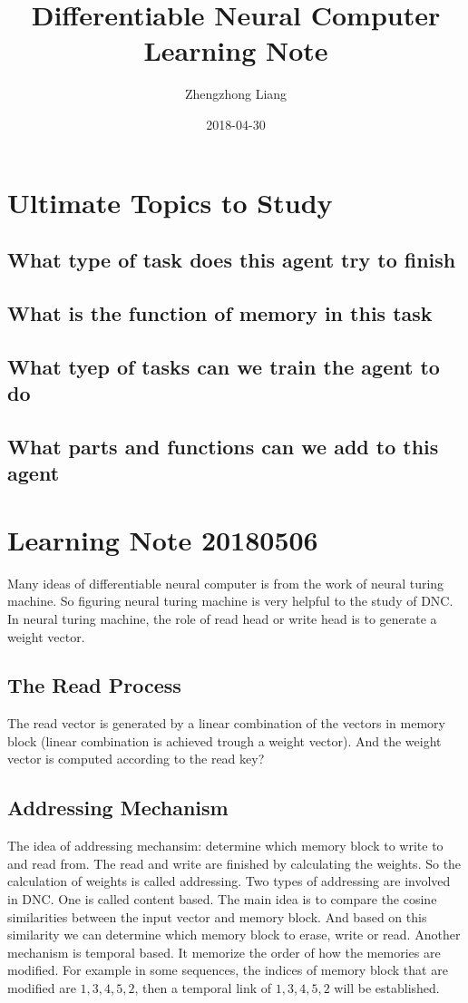 \documentclass{article}
\title{Differentiable Neural Computer Learning Note}
\author{Zhengzhong Liang}
\date{2018-04-30}
\begin{document}
\maketitle
\section{Ultimate Topics to Study}
\subsection{What type of task does this agent try to finish}
\subsection{What is the function of memory in this task}
\subsection{What tyep of tasks can we train the agent to do}
\subsection{What parts and functions can we add to this agent}

\section{Learning Note 20180506}
Many ideas of differentiable neural computer is from the work of neural turing machine. So figuring neural turing machine is very helpful to the study of DNC. In neural turing machine, the role of read head or write head is to generate a weight vector.
\subsection{The Read Process}
The read vector is generated by a linear combination of the vectors in memory block (linear combination is achieved trough a weight vector). And the weight vector is computed according to the read key?

\subsection{Addressing Mechanism}
The idea of addressing mechansim: determine which memory block to write to and read from.
The read and write are finished by calculating the weights. So the calculation of weights is called addressing. 
Two types of addressing are involved in DNC. One is called content based. The main idea is to compare the cosine similarities between the input vector and memory block. And based on this similarity we can determine which memory block to erase, write or read. Another mechanism is temporal based. It memorize the order of how the memories are modified. For example in some sequences, the indices of memory block that are modified are $1,3,4,5,2$, then a temporal link of $1,3,4,5,2$ will be established. 
\end{document}
